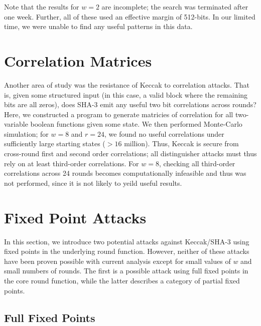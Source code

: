 \documentclass[10pt,twocolumn,twoside]{pnas-new}
\begin{document}
Note that the results for $w=2$ are incomplete; the search was terminated
after one week. Further, all of these used an effective margin of 512-bits.
In our limited time, we were unable to find any useful patterns in this data.


\section{Correlation Matrices} \label{sec:correlation}

Another area of study was the resistance of Keccak to correlation attacks.
That is, given some structured input (in this case, a valid block where the
remaining bits are all zeros), does SHA-3 emit any useful two bit correlations
across rounds? Here, we constructed a program to generate matricies of
correlation for all two-variable boolean functions given some state. We then
performed Monte-Carlo simulation; for $w=8$ and $r=24$, we found no useful
correlations under sufficiently large starting states ($>16$ million). Thus,
Keccak is secure from cross-round first and second order correlations; all
distinguisher attacks must thus rely on at least third-order correlations. For
$w=8$, checking all third-order correlations across 24 rounds becomes
computationally infeasible and thus was not performed, since it is not likely
to yeild useful results.

\section{Fixed Point Attacks} \label{sec:fixed}

In this section, we introduce two potential attacks against Keccak/SHA-3 using
fixed points in the underlying round function. However, neither of these
attacks have been proven possible with current analysis except for small values
of $w$ and small numbers of rounds. The first is a possible attack using full
fixed points in the core round function, while the latter describes a category
of partial fixed points.


\subsection{Full Fixed Points} \label{sec:f:full}
\end{document}
